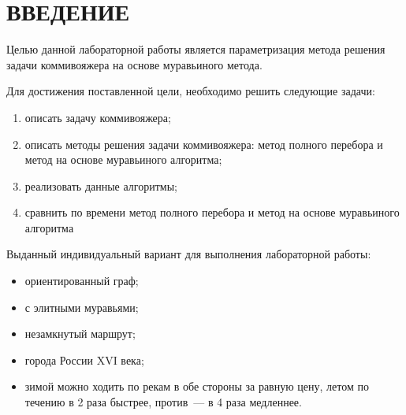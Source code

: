 \chapter*{ВВЕДЕНИЕ}

Целью данной лабораторной работы является параметризация метода решения задачи коммивояжера на основе муравьиного метода.

Для достижения поставленной цели, необходимо решить следующие задачи:
\begin{enumerate}
    \item описать задачу коммивояжера;
    \item описать методы решения задачи коммивояжера: метод полного перебора и метод на основе муравьиного алгоритма;
    \item реализовать данные алгоритмы;
    \item сравнить по времени метод полного перебора и метод на основе муравьиного алгоритма
\end{enumerate}

Выданный индивидуальный вариант для выполнения лабораторной работы:
\begin{itemize}
	\item ориентированный граф;
	\item с элитными муравьями;
	\item незамкнутый маршрут;
	\item города России XVI века;
	\item зимой можно ходить по рекам в обе стороны за равную цену, летом по течению в 2 раза быстрее, против~--- в 4 раза медленнее.
\end{itemize}
